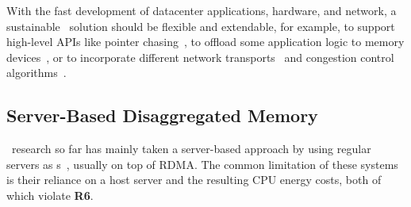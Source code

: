 With the fast development of datacenter applications, hardware, and network, a sustainable \md\ solution should be flexible and extendable,
for example, to support high-level APIs like pointer chasing~\cite{AIFM,Aguilera-FarMemory},
to offload some application logic to memory devices~\cite{AIFM,StRoM},
or to incorporate different network transports~\cite{Homa,NDP,TONIC} and congestion control algorithms~\cite{swift-sigcomm,1RMA,hpcc-sigcomm19}.

\subsection{Server-Based Disaggregated Memory}
\label{sec:clio:rdma}

\md\ research so far has mainly taken a server-based approach by using regular servers as \MN{}s~\cite{InfiniSwap,FastSwap,Semeru,Shan18-OSDI,AIFM,zombieland,FaRM},
usually on top of RDMA.
The common limitation of these systems is their reliance on a host server and the resulting CPU energy costs, both of which violate \textbf{R6}.

